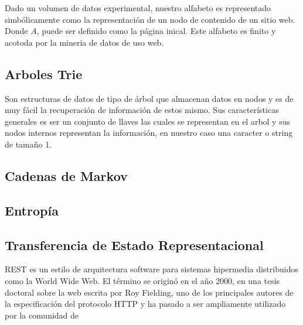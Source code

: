 Dado un volumen de datos experimental, nuestro alfabeto es representado simbólicamente como la representación de un nodo de contenido de un sitio web.
Donde $A $, puede ser definido como la página inical. Este alfabeto es finito y acotoda por la mineria de datos de uso web.



\subsection{Arboles Trie}


Son estructuras de datos de tipo de árbol que almacenan datos en nodos y es de muy fácil la recuperación de información de estos mismo. Sus características generales es ser un conjunto de llaves las cuales se representan en el arbol y sus nodos internos representan la información, en nuestro caso una caracter o string de tamaño 1.




\subsection{Cadenas de Markov}


\subsection{Entropía}


\subsection{Transferencia de Estado Representacional}

 REST es un estilo de arquitectura software para sistemas hipermedia distribuidos como la World Wide Web. El término se originó en el año 2000, en una tesis doctoral sobre la web escrita por Roy Fielding, uno de los principales autores de la especificación del protocolo HTTP y ha pasado a ser ampliamente utilizado por la comunidad de 
